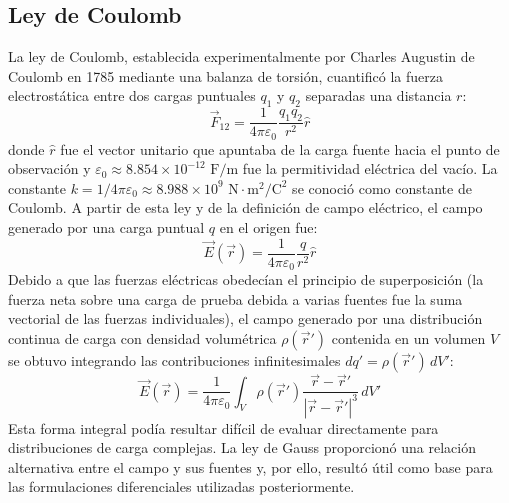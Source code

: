 \subsection{Ley de Coulomb}
La ley de Coulomb, establecida experimentalmente por Charles Augustin de Coulomb en 1785 mediante una balanza de torsión, cuantificó la fuerza electrostática entre dos cargas puntuales $q_1$ y $q_2$ separadas una distancia $r$:
\begin{equation}
    \vec{F}_{12} = \frac{1}{4\pi\varepsilon_0} \frac{q_1 q_2}{r^2} \hat{r}
\end{equation}
donde $\hat{r}$ fue el vector unitario que apuntaba de la carga fuente hacia el punto de observación y $\varepsilon_0 \approx 8.854 \times 10^{-12} \text{ F/m}$ fue la permitividad eléctrica del vacío. La constante $k = 1 / 4\pi\varepsilon_0 \approx 8.988 \times 10^9 \text{ N}\cdot\text{m}^2/\text{C}^2$ se conoció como constante de Coulomb. A partir de esta ley y de la definición de campo eléctrico, el campo generado por una carga puntual $q$ en el origen fue:
\begin{equation}
    \vec{E}(\vec{r}) = \frac{1}{4\pi\varepsilon_0} \frac{q}{r^2} \hat{r}
\end{equation}
Debido a que las fuerzas eléctricas obedecían el principio de superposición (la fuerza neta sobre una carga de prueba debida a varias fuentes fue la suma vectorial de las fuerzas individuales), el campo generado por una distribución continua de carga con densidad volumétrica $\rho(\vec{r}')$ contenida en un volumen $V$ se obtuvo integrando las contribuciones infinitesimales $dq' = \rho(\vec{r}') \, dV'$:
\begin{equation}
    \vec{E}(\vec{r}) = \frac{1}{4\pi\varepsilon_0} \int_V \rho(\vec{r}') \frac{\vec{r} - \vec{r}'}{|\vec{r} - \vec{r}'|^3} \, dV'
\end{equation}
Esta forma integral podía resultar difícil de evaluar directamente para distribuciones de carga complejas. La ley de Gauss proporcionó una relación alternativa entre el campo y sus fuentes y, por ello, resultó útil como base para las formulaciones diferenciales utilizadas posteriormente.

